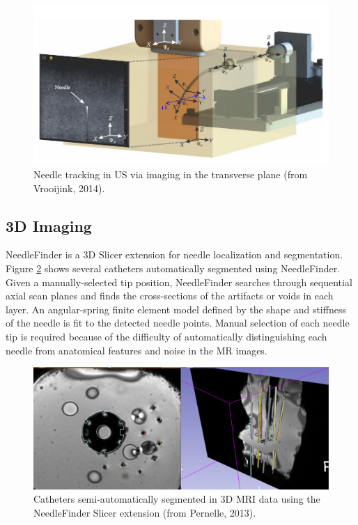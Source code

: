\begin{figure}[h]
\includegraphics[width=1.0\textwidth]{Fig/chap2/vrooijink_US_tracking.png}
\caption{Needle tracking in US via imaging in the transverse plane (from Vrooijink, 2014\cite{vrooijink_needle_2014}).}
\label{fig:transverse_planes_us}
\end{figure}

\subsection{3D Imaging}
NeedleFinder is a 3D Slicer extension for needle localization and segmentation\cite{pernelle_validation_2013}. Figure \ref{fig:needlefinder} shows several catheters automatically segmented using NeedleFinder. Given a manually-selected tip position, NeedleFinder searches through sequential axial scan planes and finds the cross-sections of the artifacts or voids in each layer. An angular-spring finite element model defined by the shape and stiffness of the needle is fit to the detected needle points. Manual selection of each needle tip is required because of the difficulty of automatically distinguishing each needle from anatomical features and noise in the MR images.

\begin{figure}[h]
\includegraphics[width=1.0\textwidth]{Fig/chap2/needlefinder.png}
\caption{Catheters semi-automatically segmented in 3D MRI data using the NeedleFinder Slicer extension (from Pernelle, 2013\cite{pernelle_validation_2013}).}
\label{fig:needlefinder}
\end{figure}

